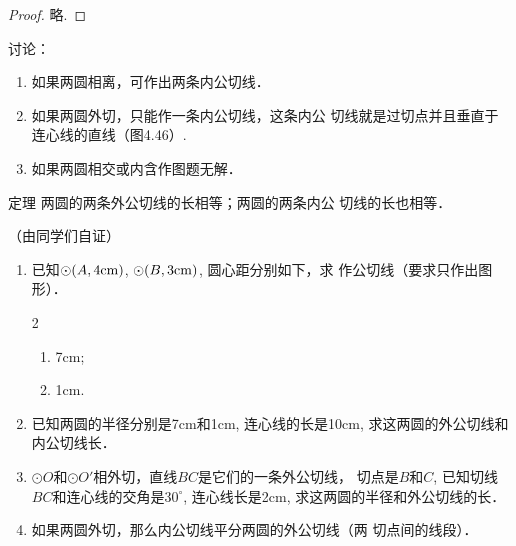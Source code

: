 \begin{proof}
  略.
\end{proof}

讨论：
\begin{enumerate}
\item 如果两圆相离，可作出两条内公切线．
\item 如果两圆外切，只能作一条内公切线，这条内公
切线就是过切点并且垂直于连心线的直线（图4.46）.
\item 如果两圆相交或内含作图题无解．
\end{enumerate}

\begin{blk}
    {定理} 两圆的两条外公切线的长相等；两圆的两条内公
切线的长也相等．
\end{blk}

（由同学们自证）



\begin{ex}
\begin{enumerate}
    \item 已知$\odot(A,4{\rm cm})$, $\odot(B,3{\rm cm})$, 圆心距分别如下，求
    作公切线（要求只作出图形）．
\begin{multicols}{2}
    \begin{enumerate}
        \item 7cm;
        \item 1cm.
    \end{enumerate}
\end{multicols}
    \item 已知两圆的半径分别是7cm和1cm, 连心线的长是10cm, 
    求这两圆的外公切线和内公切线长．
    \item $\odot O$和$\odot O'$相外切，直线$BC$是它们的一条外公切线，
    切点是$B$和$C$, 已知切线$BC$和连心线的交角是$30^{\circ}$, 
    连心线长是2cm, 求这两圆的半径和外公切线的长．
    \item 如果两圆外切，那么内公切线平分两圆的外公切线（两
    切点间的线段）．
\end{enumerate}
\end{ex}

